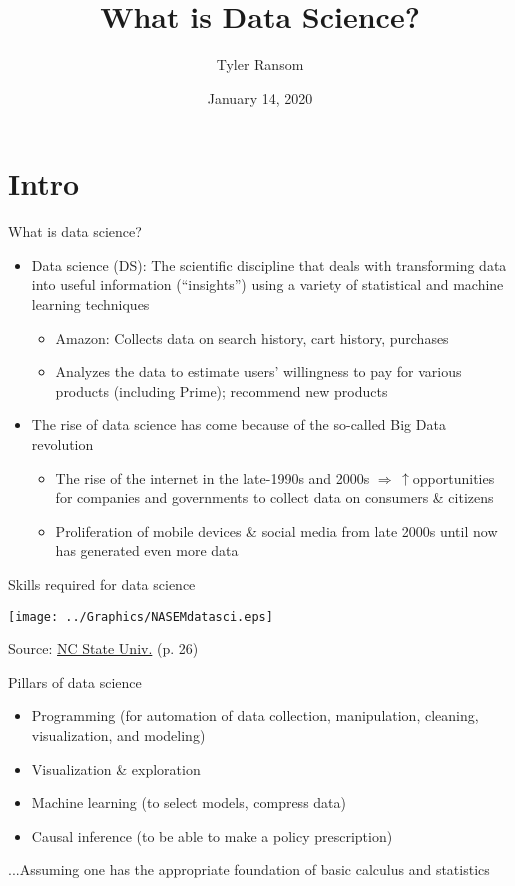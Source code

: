 \documentclass[english,aspectratio=169,12pt,xcolor=dvipsnames]{beamer}
\title{What is Data Science?}
\author{Tyler Ransom}
\institute[OU Econ]{\normalsize{University of Oklahoma, Dept. of Economics}}
\date{January 14, 2020}
\begin{document}
{
\frame[noframenumbering]{\titlepage}
}


\section{Intro}
\begin{frame}{What is data science?}
\begin{itemize}
\item \alert{Data science (DS):} The scientific discipline that deals with transforming data into useful information (``insights'') using a variety of statistical and machine learning techniques
    \begin{itemize}
    \item \alert{Amazon:} Collects data on search history, cart history, purchases
    \item Analyzes the data to estimate users' willingness to pay for various products (including Prime); recommend new products
    \end{itemize}
\item The rise of data science has come because of the so-called Big Data revolution
    \begin{itemize}
    \item The rise of the internet in the late-1990s and 2000s $\Rightarrow \,\uparrow$opportunities for companies and governments to collect data on consumers \& citizens
    \item Proliferation of mobile devices \& social media from late 2000s until now has generated even more data
    \end{itemize}
\end{itemize}
\end{frame}


\begin{frame}{Skills required for data science}
\begin{center}
\texttt{[image: ../Graphics/NASEMdatasci.eps]}
\end{center}
{\scriptsize Source: \href{http://sites.nationalacademies.org/cs/groups/cstbsite/documents/webpage/cstb_181680.pdf}{NC State Univ.} (p. 26)}
\end{frame}

\begin{frame}{Pillars of data science}
\begin{itemize}
\item Programming (for automation of data collection, manipulation, cleaning, visualization, and modeling)
\item Visualization \& exploration
\item Machine learning (to select models, compress data)
\item Causal inference (to be able to make a policy prescription)
\end{itemize}
...Assuming one has the appropriate foundation of basic calculus and statistics
\end{frame}
\end{document}
